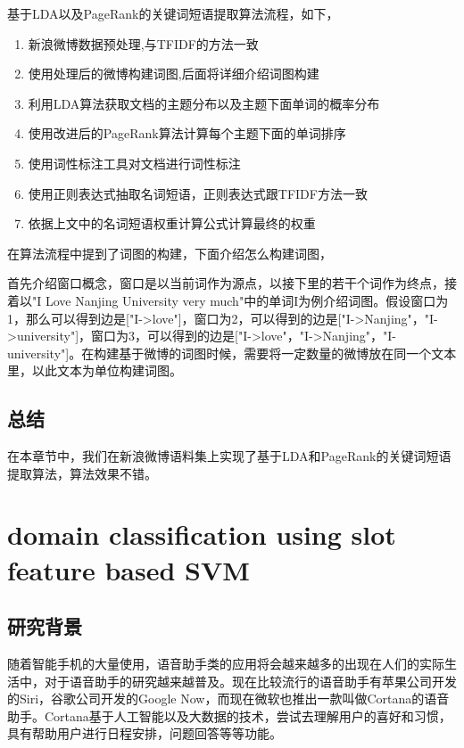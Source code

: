 \documentclass[master]{njuthesis}
\begin{document}
    基于LDA以及PageRank的关键词短语提取算法流程，如下，
    \begin{enumerate}
       \item 新浪微博数据预处理,与TFIDF的方法一致
       \item 使用处理后的微博构建词图,后面将详细介绍词图构建
       \item 利用LDA算法获取文档的主题分布以及主题下面单词的概率分布
       \item 使用改进后的PageRank算法计算每个主题下面的单词排序
       \item 使用词性标注工具对文档进行词性标注
       \item 使用正则表达式抽取名词短语，正则表达式跟TFIDF方法一致
       \item 依据上文中的名词短语权重计算公式计算最终的权重
    \end{enumerate}
    
    在算法流程中提到了词图的构建，下面介绍怎么构建词图，

    首先介绍窗口概念，窗口是以当前词作为源点，以接下里的若干个词作为终点，接着以"I Love Nanjing University very much"中的单词I为例介绍词图。假设窗口为1，那么可以得到边是["I->love"]，窗口为2，可以得到的边是["I->Nanjing"，"I->university"]，窗口为3，可以得到的边是["I->love"，"I->Nanjing"，"I-university"]。在构建基于微博的词图时候，需要将一定数量的微博放在同一个文本里，以此文本为单位构建词图。

\section{总结}

    在本章节中，我们在新浪微博语料集上实现了基于LDA和PageRank的关键词短语提取算法，算法效果不错。

\chapter{domain classification using slot feature based SVM}\label{chapter_smallworld}

\section{研究背景}

    随着智能手机的大量使用，语音助手类的应用将会越来越多的出现在人们的实际生活中，对于语音助手的研究越来越普及。现在比较流行的语音助手有苹果公司开发的Siri，谷歌公司开发的Google Now，而现在微软也推出一款叫做Cortana的语音助手。Cortana基于人工智能以及大数据的技术，尝试去理解用户的喜好和习惯，具有帮助用户进行日程安排，问题回答等等功能。
\end{document}
